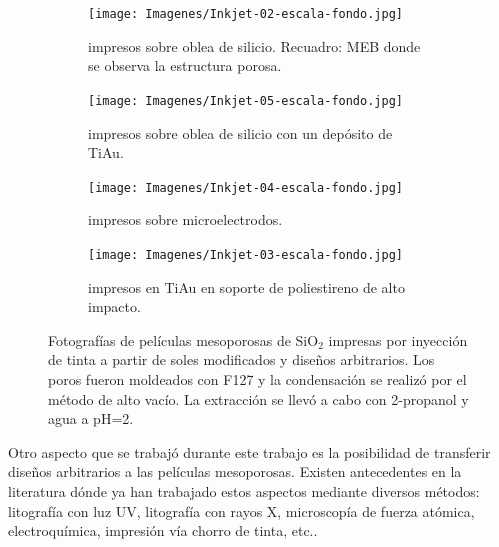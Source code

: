   			\begin{figure}[b!]
			 	   	    \centering
			 	   	    \begin{subfigure}[t]{0.495\textwidth}
			        	\texttt{[image: Imagenes/Inkjet-02-escala-fondo.jpg]}
			        	\caption{\pdmF\space impresos sobre oblea de silicio. Recuadro: MEB donde se observa la estructura porosa.}
			       		\end{subfigure}
			     		\centering
			     		\begin{subfigure}[t]{0.495\textwidth}
			     		\texttt{[image: Imagenes/Inkjet-05-escala-fondo.jpg]}
			    		\caption{\pdmF\space impresos sobre oblea de silicio con un depósito de Ti\textbar Au.}
			    		\end{subfigure}
			    		\centering
			    		\begin{subfigure}[t]{0.495\textwidth}
			         	\texttt{[image: Imagenes/Inkjet-04-escala-fondo.jpg]}
			        	\caption{\pdmF\space impresos sobre microelectrodos.}
			        	\end{subfigure}
			        	\centering
			        	\begin{subfigure}[t]{0.495\textwidth}
			     		\texttt{[image: Imagenes/Inkjet-03-escala-fondo.jpg]}
 			        	\caption{\pdmF\space impresos en Ti\textbar	Au en soporte de poliestireno de alto impacto.}
			        	\end{subfigure}
			     		\caption[Electrodos impresos]{Fotografías de películas mesoporosas de SiO$_2$ impresas por inyección de tinta a partir de soles modificados y diseños arbitrarios. Los poros fueron moldeados con F127 y la condensación se realizó por el método de alto vacío. La extracción se llevó a cabo con 2-propanol y agua a pH=2.}
			     		\label{fig:flexibles}
			     	   	\end{figure}

 	  Otro aspecto que se trabajó durante este trabajo es la posibilidad de transferir diseños arbitrarios a las películas mesoporosas. Existen antecedentes en la literatura dónde ya han trabajado estos aspectos mediante diversos métodos: litografía con luz UV, litografía con rayos X, microscopía de fuerza atómica, electroquímica, impresión vía chorro de tinta, etc.\cite{Innocenzi2008}. 

